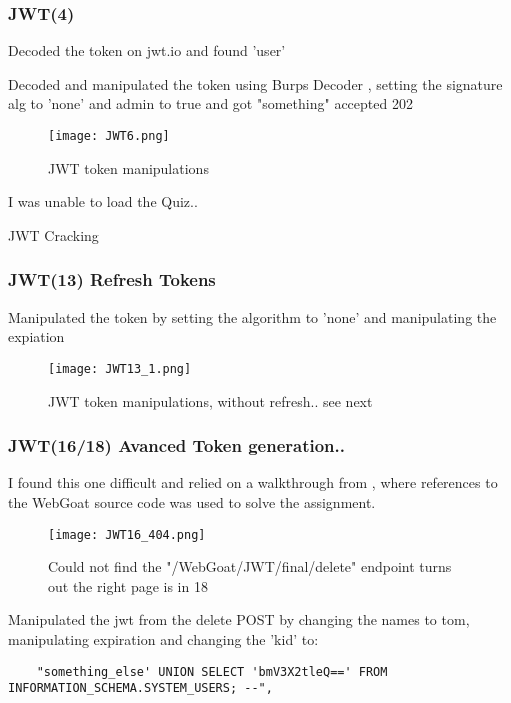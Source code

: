 \documentclass[
	letterpaper, %
	10pt, %
	unnumberedsections, %
	twoside, %
]{APAAssignment}
\begin{document}
\begin{appendices}
\subsubsection{JWT(4)}
Decoded the token on jwt.io and found 'user'

Decoded and manipulated the token using Burps Decoder , setting the signature alg to 'none' and admin to true and got "something" accepted 202

\begin{figure}[!ht] %
	\centering
	\texttt{[image: JWT6.png]}
	\caption{JWT token manipulations}
	\label{fig:app:JWT6}
\end{figure}

I was unable to load the Quiz..


JWT Cracking


\subsubsection{JWT(13) Refresh Tokens}
Manipulated the token by setting the algorithm to 'none' and manipulating the expiation

\begin{figure}[!ht] %
	\centering
	\texttt{[image: JWT13\_1.png]}
	\caption{JWT token manipulations, without refresh.. see next}
	\label{fig:app:JWT13}
\end{figure}


\subsubsection{JWT(16/18) Avanced Token generation..}
I found this one difficult and relied on a walkthrough from \cite{MediumJWT8}, where references to the WebGoat source code was used to solve the assignment.

\begin{figure}[!ht] %
	\centering
	\texttt{[image: JWT16\_404.png]}
	\caption{Could not find the "/WebGoat/JWT/final/delete" endpoint turns out the right page is in 18}
	\label{fig:app:JWT16}
\end{figure}

Manipulated the jwt from the delete POST by changing the names to tom, manipulating expiration and changing the 'kid' to: 
\begin{verbatim}
	"something_else' UNION SELECT 'bmV3X2tleQ==' FROM INFORMATION_SCHEMA.SYSTEM_USERS; --", 
\end{verbatim}


\end{appendices}
\end{document}
